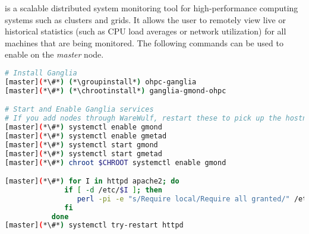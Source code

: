 \Ganglia{} is a scalable distributed system monitoring tool for high-performance
computing systems such as clusters and grids. It allows the user to remotely
view live or historical statistics (such as CPU load averages or network
utilization) for all machines that are being monitored.  The following commands
can be used to enable  \Ganglia{} on the {\em master} node.

\begin{lstlisting}[language=bash,keywords={},upquote=true]
# Install Ganglia
[master](*\#*) (*\groupinstall*) ohpc-ganglia
[master](*\#*) (*\chrootinstall*) ganglia-gmond-ohpc

# Start and Enable Ganglia services
# If you add nodes through WareWulf, restart these to pick up the hostnames rather than the IPs
[master](*\#*) systemctl enable gmond
[master](*\#*) systemctl enable gmetad
[master](*\#*) systemctl start gmond
[master](*\#*) systemctl start gmetad
[master](*\#*) chroot $CHROOT systemctl enable gmond

[master](*\#*) for I in httpd apache2; do
              if [ -d /etc/$I ]; then
                 perl -pi -e "s/Require local/Require all granted/" /etc/$I/conf.d/ganglia-ohpc.conf
              fi
           done 
[master](*\#*) systemctl try-restart httpd
\end{lstlisting}

